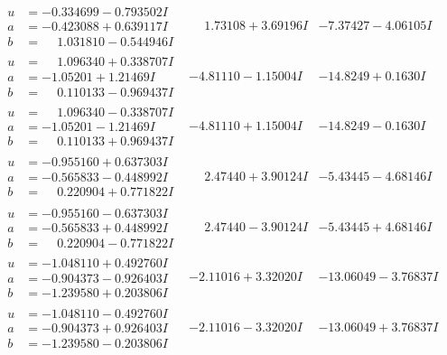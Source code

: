\documentclass[1p]{elsarticle_modified}
\theoremstyle{definition}
\begin{document}
$$\begin{array}{c|c|c}
\begin{aligned}
u &= -0.334699 - 0.793502 I \\
a &= -0.423088 + 0.639117 I \\
b &= \phantom{-}1.031810 - 0.544946 I\end{aligned}
 & \phantom{-}1.73108 + 3.69196 I & -7.37427 - 4.06105 I \\ \hline\begin{aligned}
u &= \phantom{-}1.096340 + 0.338707 I \\
a &= -1.05201 + 1.21469 I \\
b &= \phantom{-}0.110133 - 0.969437 I\end{aligned}
 & -4.81110 - 1.15004 I & -14.8249 + 0.1630 I \\ \hline\begin{aligned}
u &= \phantom{-}1.096340 - 0.338707 I \\
a &= -1.05201 - 1.21469 I \\
b &= \phantom{-}0.110133 + 0.969437 I\end{aligned}
 & -4.81110 + 1.15004 I & -14.8249 - 0.1630 I \\ \hline\begin{aligned}
u &= -0.955160 + 0.637303 I \\
a &= -0.565833 - 0.448992 I \\
b &= \phantom{-}0.220904 + 0.771822 I\end{aligned}
 & \phantom{-}2.47440 + 3.90124 I & -5.43445 - 4.68146 I \\ \hline\begin{aligned}
u &= -0.955160 - 0.637303 I \\
a &= -0.565833 + 0.448992 I \\
b &= \phantom{-}0.220904 - 0.771822 I\end{aligned}
 & \phantom{-}2.47440 - 3.90124 I & -5.43445 + 4.68146 I \\ \hline\begin{aligned}
u &= -1.048110 + 0.492760 I \\
a &= -0.904373 - 0.926403 I \\
b &= -1.239580 + 0.203806 I\end{aligned}
 & -2.11016 + 3.32020 I & -13.06049 - 3.76837 I \\ \hline\begin{aligned}
u &= -1.048110 - 0.492760 I \\
a &= -0.904373 + 0.926403 I \\
b &= -1.239580 - 0.203806 I\end{aligned}
 & -2.11016 - 3.32020 I & -13.06049 + 3.76837 I \\ \hline\begin{aligned}

\end{aligned}
\end{array}$$
\end{document}
